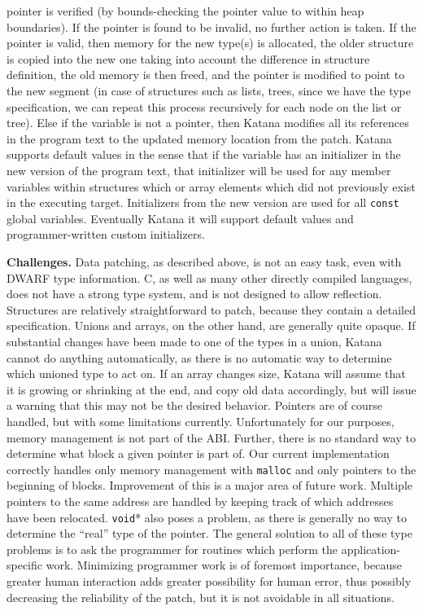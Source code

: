 pointer is verified (by bounds-checking the pointer value to within
heap boundaries).  If the pointer is found to be invalid, no further
action is taken.  If the pointer is valid, then memory for the new
type(s) is allocated, the older structure is copied into the new one
taking into account the difference in structure definition, the old
memory is then freed, and the pointer is modified to point to the new
segment (in case of structures such as lists, trees, since we have the
type specification, we can repeat this process recursively for each
node on the list or tree). Else if the variable is not a pointer, then
Katana modifies all its references in the program text to the updated
memory location from the patch. Katana supports default values in the
sense that if the variable has an initializer in the new version of
the program text, that initializer will be used for any member
variables within structures which or array elements which did not
previously exist in the executing target. Initializers from the new
version are used for all \texttt{const} global variables.
Eventually Katana it will support default values and programmer-written
custom initializers.

{\bf Challenges.} %
Data patching, as described above, is not an easy task, even with
DWARF type information. C, as well as many other directly compiled
languages, does not have a strong type system, and is not designed to
allow reflection. Structures are relatively straightforward to patch,
because they contain a detailed specification. Unions and arrays, on
the other hand, are generally quite opaque. If substantial changes
have been made to one of the types in a union, Katana cannot do
anything automatically, as there is no automatic way to determine
which unioned type to act on. If an array changes size, Katana will
assume that it is growing or shrinking at the end, and copy old data
accordingly, but will issue a warning that this may not be the desired
behavior. Pointers are of course handled, but with some limitations
currently. Unfortunately for our purposes, memory management is not
part of the ABI. Further, there is no standard way to determine what
block a given pointer is part of. Our current implementation correctly
handles only memory management with \texttt{malloc} and only pointers to the
beginning of blocks. Improvement of this is a major area of future
work. Multiple pointers to the same address are handled by keeping track
of which addresses have been relocated. \texttt{void}* also poses a
problem, as there is generally no way to determine the ``real'' type
of the pointer. The general solution to all of these type problems is
to ask the programmer for routines which perform the
application-specific work. Minimizing programmer work is of foremost
importance, because greater human interaction adds greater possibility
for human error, thus possibly decreasing the reliability of the
patch, but it is not avoidable in all situations.

